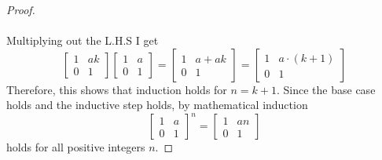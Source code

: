\documentclass[titlepage]{article}
\newenvironment{problem}[2][Problem]{\begin{trivlist}
\item[\hskip \labelsep {\bfseries #1}\hskip \labelsep {\bfseries #2.}]}{\end{trivlist}}
\begin{document}
\begin{problem}{5}
\begin{proof}
$$$$
\\Multiplying out the L.H.S I get
$$
\begin{bmatrix}1 & ak \\ 0 & 1 \end{bmatrix}  \begin{bmatrix} 1 & a \\ 0 & 1 \end{bmatrix} =  \begin{bmatrix} 1 & a+ ak \\ 0 & 1 \end{bmatrix} =  \begin{bmatrix} 1 & a\cdot(k+1) \\ 0 & 1 \end{bmatrix}
$$
Therefore, this shows that induction holds for $n=k+1$. Since the base case holds and the inductive step holds, by mathematical induction 
$$\begin{bmatrix} 1 & a \\ 0 & 1 \end{bmatrix}^{n}=\begin{bmatrix} 1 & an \\ 0 & 1 \end{bmatrix}$$
 holds for all positive integers $n$.
\end{proof}

\end{problem}
\end{document}
